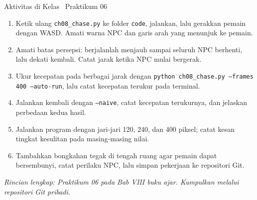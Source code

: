 \documentclass[aspectratio=169,10pt]{beamer}
\begin{document}
\begin{frame}{Aktivitas di Kelas \textperiodcentered\ Praktikum 06}
\begin{enumerate}
  \item Ketik ulang \texttt{ch08\_chase.py} ke folder \texttt{code}, jalankan,
        lalu gerakkan pemain dengan WASD. Amati warna NPC dan garis arah yang
        menunjuk ke pemain.
  \item Amati batas persepsi: berjalanlah menjauh sampai seluruh NPC berhenti,
        lalu dekati kembali. Catat jarak ketika NPC mulai bergerak.
  \item Ukur kecepatan pada berbagai jarak dengan
        \texttt{python ch08\_chase.py --frames 400 --auto-run}, lalu catat
        kecepatan terukur pada terminal.
  \item Jalankan kembali dengan \texttt{--naive}, catat kecepatan terukurnya,
        dan jelaskan perbedaan kedua hasil.
  \item Jalankan program dengan jari-jari 120, 240, dan 400 piksel; catat kesan
        tingkat kesulitan pada masing-masing nilai.
  \item Tambahkan bongkahan tegak di tengah ruang agar pemain dapat
        bersembunyi, catat perilaku NPC, lalu simpan pekerjaan ke repositori
        Git.
\end{enumerate}
\vspace{0.10cm}
{\footnotesize\color{ubAccent}\itshape Rincian lengkap: Praktikum 06 pada
Bab VIII buku ajar. Kumpulkan melalui repositori Git pribadi.}
\end{frame}
\end{document}
